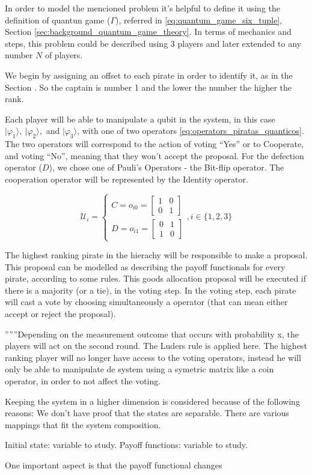 In order to model the mencioned problem it's helpful to define it using the definition of quantun game ($\Gamma$), referred in \ref{eq:quantum_game_six_tuple}, Section \ref{sec:background_quantum_game_theory}.
In terms of mechanics and steps, this problem could be described using 3 players and later extended to any number $N$ of players. 

We begin by assigning an offset to each pirate in order to identify it, as in the Section \label{subsec:description}. So the captain is number 1 and the lower the number the higher the rank. 

Each player will be able to manipulate a qubit in the system, in this case $\vert\varphi_{1}\rangle,\:\vert\varphi_{2}\rangle,$ and $\vert\varphi_{3}\rangle$, with one of two operators \ref{eq:operators_piratas_quanticos}. The two operators will correspond to the action of voting ``Yes'' or to Cooperate, and voting ``No'', meaning that they won't accept the proposal. For the defection operator ($D$), we chose one of Pauli's Operators - the Bit-flip operator. The cooperation operator will be represented by the Identity operator. 

\begin{equation}
\label{eq:operators_piratas_quanticos}
\mathcal{U}_{i} = \begin{cases}
C = o_{i0}=\left[\begin{array}{cc}
1 & 0\\
0 & 1
\end{array}\right]\\
D = o_{i1}=\left[\begin{array}{cc}
0 & 1\\
1 & 0
\end{array}\right]
\end{cases} , i \in \{ 1, 2, 3 \}
\end{equation}

 The highest ranking pirate in the hierachy will be responsible to make a proposal. This proposal can be modelled as describing the payoff functionals for every pirate, according to some rules. This goods allocation proposal will be executed if there is a majority (or a tie), in the voting step. In the voting step, each pirate will cast a vote by choosing simultaneously a operator (that can mean either accept or reject the proposal).

''''''Depending on the measurement outcome that occurs with probability x, the players will act on the second round. The Luders rule is applied here. The highest ranking player will no longer have access to the voting operators, instead he will only be able to manipulate de system using a symetric matrix like a coin operator, in order to not affect the voting.

Keeping the system in a higher dimension is considered because of the following reasons: We don't have proof that the states are separable. There are various mappings that fit the system composition. 


Initial state: variable to study.
Payoff functions: variable to study.

\begin{emph}
One important aspect is that the payoff functional changes
\end{emph}